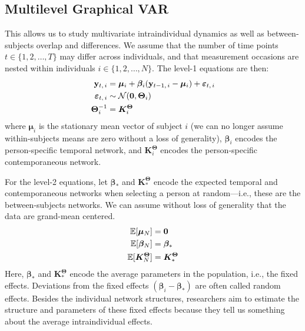 \subsection{Multilevel Graphical VAR}
This allows us to study multivariate intraindividual dynamics as well as between-subjects overlap and differences. We assume that the number of time points $t \in \{1,2,\ldots,T\}$ may differ across individuals, and that measurement occasions are nested within individuals $i \in \{1,2,\ldots,N\}$. The level-1 equations are then:
\begin{equation}
    \begin{split}
        \mathbf{y}_{t,\,i} &= \bm{\mu}_i + \bm{\beta}_i (\mathbf{y}_{t-1,\,i} - \bm{\mu}_i) + \bm{\varepsilon}_{t,\,i} \\
        \bm{\varepsilon}_{t,\,i} &\sim \mathcal{N}(\mathbf{0}, \bm{\Theta}_i) \\
        \bm{\Theta}_i^{-1} &= \bm{K}_i^{\bm{\Theta}}
    \end{split}
\end{equation}
where $\bm{\mu}_i$ is the stationary mean vector of subject $i$ (we can no longer assume within-subjects means are zero without a loss of generality), $\bm{\beta}_i$ encodes the person-specific temporal network, and $\bm{K}_i^{\bm{\Theta}}$ encodes the person-specific contemporaneous network. 

For the level-2 equations, let $\bm{\beta}_{*}$ and $\bm{K}_{*}^{\bm{\Theta}}$ encode the expected temporal and contemporaneous networks when selecting a person at random---i.e., these are the between-subjects networks. We can assume without loss of generality that the data are grand-mean centered. 
\begin{equation}
    \begin{split}
        \mathbb{E} \lbrack \bm{\mu}_N \rbrack &= \mathbf{0} \\
        \mathbb{E} \lbrack \bm{\beta}_N \rbrack &= \bm{\beta}_{*} \\
        \mathbb{E} \lbrack \bm{K}_N^{\bm{\Theta}} \rbrack &= \bm{K}_{*}^{\bm{\Theta}}
    \end{split}
\end{equation}
Here, $\bm{\beta}_{*}$ and $\bm{K}_{*}^{\bm{\Theta}}$ encode the average parameters in the population, i.e., the fixed effects. Deviations from the fixed effects $(\bm{\beta}_i - \bm{\beta}_{*})$ are often called random effects. Besides the individual network structures, researchers aim to estimate the structure and parameters of these fixed effects because they tell us something about the average intraindividual effects.

